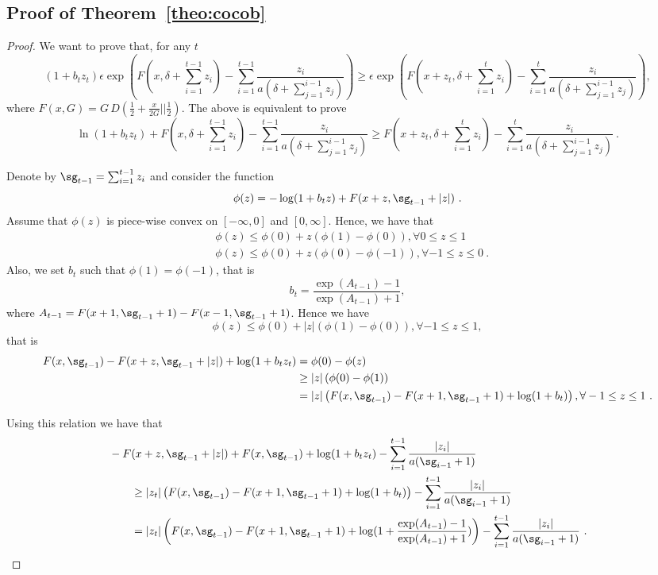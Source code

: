 \subsection{Proof of Theorem~\ref{theo:cocob}}
\begin{proof}
We want to prove that, for any $t$
\[
(1+b_t z_t) \epsilon \exp\left( F(x,\delta+\sum_{i=1}^{t-1} z_i) - \sum_{i=1}^{t-1} \frac{z_i}{a (\delta+\sum_{j=1}^{i-1} z_j)}\right)
\geq \epsilon \exp\left(F(x+z_t,\delta+\sum_{i=1}^{t} z_i) - \sum_{i=1}^{t} \frac{z_i}{a (\delta+\sum_{j=1}^{i-1} z_j)}\right),
\]
where $F(x,G)= G \, D(\frac{1}{2}+\frac{x}{2 G}||\frac{1}{2})$.
The above is equivalent to prove
\[
\ln(1+b_t z_t) + F(x,\delta+\sum_{i=1}^{t-1} z_i)- \sum_{i=1}^{t-1} \frac{z_i}{a (\delta+\sum_{j=1}^{i-1} z_j)}
\geq F(x+z_t,\delta+\sum_{i=1}^{t} z_i)- \sum_{i=1}^{t} \frac{z_i}{a (\delta+\sum_{j=1}^{i-1} z_j)}~.
\]

Denote by $\sg_{t-1}=\sum_{i=1}^{t-1} z_i$ and consider the function 
\[
\phi(z)=-\log(1+b_t z) + F(x+z,\sg_{t-1} + |z|)~.
\]
Assume that $\phi(z)$ is piece-wise convex on $[-\infty,0]$ and $[0,\infty]$. Hence, we have that
\begin{align*}
&\phi(z) \leq \phi(0)+z (\phi(1)-\phi(0)), \forall 0 \leq z\leq 1\\
&\phi(z) \leq \phi(0)+z (\phi(0)-\phi(-1)), \forall -1 \leq z\leq 0~.
\end{align*}
Also, we set $b_t$ such that $\phi(1)=\phi(-1)$, that is
\[
b_t = \frac{\exp(A_{t-1})-1}{\exp(A_{t-1})+1},
\]
where $A_{t-1}=F(x+1,\sg_{t-1} + 1)-F(x-1,\sg_{t-1} + 1)$.
Hence we have
\[
\phi(z) \leq \phi(0)+ |z| (\phi(1)-\phi(0)), \forall -1 \leq z\leq 1,
\]
that is
\begin{align*}
F(x,\sg_{t-1})-F(x+z,\sg_{t-1}+|z|) + \log(1+b_t z_t) 
& = \phi(0) - \phi(z) \\
& \geq |z| \left(\phi(0) - \phi(1)\right) \\
&= |z| \left(F(x,\sg_{t-1}) - F(x+1,\sg_{t-1}+1) + \log(1+b_t)\right), \forall -1 \leq z\leq 1~.
\end{align*}

Using this relation we have that
\begin{align*}
&-F(x+z,\sg_{t-1}+|z|) + F(x,\sg_{t-1})+\log(1+b_t z_t)-\sum_{i=1}^{t-1} \frac{|z_i|}{a (\sg_{i-1} + 1)} \\
&\qquad \geq |z_t| \left(F(x,\sg_{t-1}) - F(x+1,\sg_{t-1}+1) + \log(1+b_t)\right) - \sum_{i=1}^{t-1} \frac{|z_i|}{a (\sg_{i-1} + 1)} \\
&\qquad = |z_t| \left(F(x,\sg_{t-1}) - F(x+1,\sg_{t-1}+1) + \log(1+\frac{\exp(A_{t-1})-1}{\exp(A_{t-1})+1})\right) - \sum_{i=1}^{t-1} \frac{|z_i|}{a (\sg_{i-1} + 1)}~.
\end{align*}


\end{proof}
